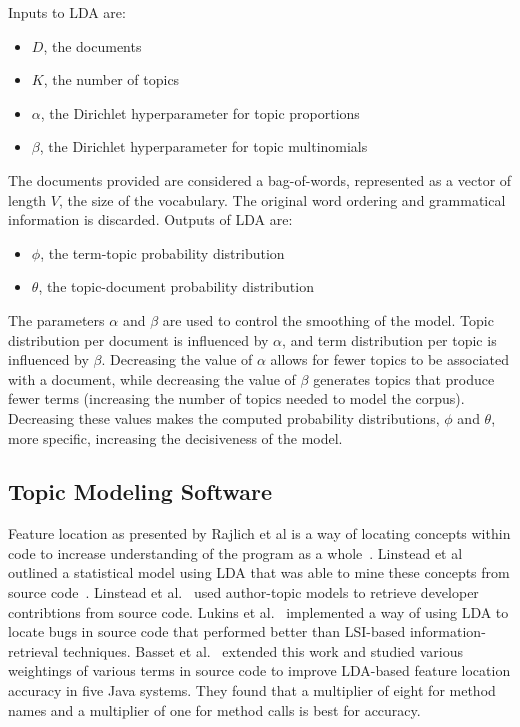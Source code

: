 {Inputs to LDA are:
\begin{itemize}
\item $D$, the documents
\item $K$, the number of topics
\item $\alpha$, the Dirichlet hyperparameter for topic proportions
\item $\beta$, the Dirichlet hyperparameter for topic multinomials
\end{itemize}

The documents provided are considered a bag-of-words,
represented as a vector of length $V\!$, the size of the vocabulary.
The original word ordering and grammatical information is discarded.
Outputs of LDA are:
\begin{itemize}
\item $\phi$, the term-topic probability distribution
\item $\theta$, the topic-document probability distribution
\end{itemize}

The parameters $\alpha$ and $\beta$ are used to control the smoothing of the model.
Topic distribution per document is influenced by $\alpha$,
and term distribution per topic is influenced by $\beta$.
Decreasing the value of $\alpha$ allows for fewer topics to be associated with a document,
while decreasing the value of $\beta$ generates topics that produce fewer terms
(increasing the number of topics needed to model the corpus).
Decreasing these values makes the computed probability distributions, $\phi$ and $\theta$,
more specific, increasing the decisiveness of the model.

\subsection{Topic Modeling Software}

Feature location as presented by Rajlich et al
is a way of locating concepts within code to increase understanding of the program as a whole~\cite{Rajlich-Wilde:2002}.
Linstead et al outlined a statistical model using LDA that was able to mine these concepts from source code~\cite{Linstead-etal:2007b}.
Linstead et al.~\cite{Linstead-etal:2007} used author-topic models to retrieve
developer contribtions from source code.
Lukins et al.~\cite{Lukins-etal:2008} implemented a way of using LDA to locate bugs in source
code that performed better than LSI-based information-retrieval
techniques.
Basset et al.~\cite{Bassett-Kraft:2013} extended this work
and studied various weightings of various terms in source code
to improve LDA-based feature location accuracy in five Java systems.
They found that a multiplier of eight for method names and a multiplier
of one for method calls is best for accuracy.

}
